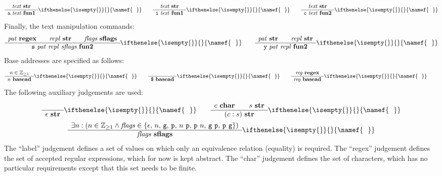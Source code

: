 \documentclass[11pt]{article}
\newcommand{\ifempty}[3]{\ifthenelse{\isempty{#1}}{#2}{#3}}
\newcommand\RULE[3][]{\begin{array}{c} #2 \\ \hline #3 \end{array}\ifempty{#1}{}{\namef{\text{\ \ #1}}}}
\newcommand\J[1]{\ensuremath{\textbf{#1}}}
\newcommand\cmd[1]{\ensuremath{\text{\texttt{#1}}}}
\renewcommand\arg[1]{\ensuremath{\mathit{#1}}}
\begin{document}
\begin{gather*}
	\RULE{\arg{text}\ \J{str}}{\cmd{a}\ \arg{text}\ \J{fun1}} \qquad
	\RULE{\arg{text}\ \J{str}}{\cmd{i}\ \arg{text}\ \J{fun1}} \qquad
	\RULE{\arg{text}\ \J{str}}{\cmd{c}\ \arg{text}\ \J{fun2}}
\end{gather*}
Finally, the text manipulation commands:
\begin{gather*}
	\RULE{\arg{pat}\ \J{regex} \qquad \arg{repl}\ \J{str} \qquad \arg{flags}\ \J{sflags}}{\cmd{s}\ \arg{pat}\ \arg{repl}\ \arg{sflags}\ \J{fun2}} \qquad
	\RULE{\arg{pat}\ \J{str} \qquad \arg{repl}\ \J{str}}{\cmd{y}\ \arg{pat}\ \arg{repl}\ \J{fun2}}
\end{gather*}
Base addresses are specified as follows:
\begin{gather*}
	\RULE{n \in \mathbb{Z}_{\geq 1}}{n\ \J{basead}} \qquad
	\RULE{}{\cmd{\$}\ \J{basead}} \qquad
	\RULE{\arg{reg}\ \J{regex}}{\arg{reg}\ \J{basead}} \qquad
\end{gather*}
The following auxiliary judgements are used:
\begin{gather*}
	\RULE{}{\epsilon\ \J{str}} \qquad
	\RULE{c\ \J{char} \qquad s\ \J{str}}{(c : s)\ \J{str}} \\
	\RULE{\exists n : (n \in \mathbb{Z}_{\geq1} \land \arg{flags} \in \{\epsilon,\, n,\, \cmd{g},\, \cmd{p},\, n\ \cmd{p},\, \cmd{p}\ n,\, \cmd{g}\ \cmd{p},\, \cmd{p}\ \cmd{g}\})}{\arg{flags}\ \J{sflags}}
\end{gather*}
The ``label'' judgement defines a set of values on which only an equivalence relation (equality) is required.
The ``regex'' judgement defines the set of accepted regular expressions, which for now is kept abstract.
The ``char'' judgement defines the set of characters, which has no particular requirements except that this set needs to be finite.
\end{document}
